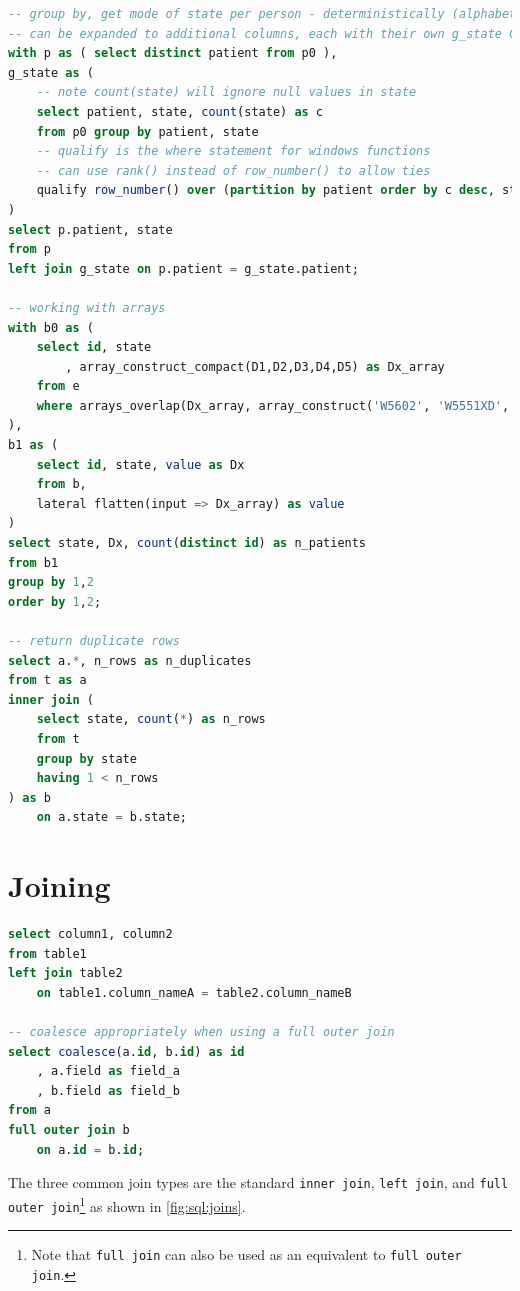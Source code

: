 \begin{lstlisting}[language=SQL]
-- group by, get mode of state per person - deterministically (alphabetical order)
-- can be expanded to additional columns, each with their own g_state CTEs
with p as ( select distinct patient from p0 ),
g_state as (
	-- note count(state) will ignore null values in state
	select patient, state, count(state) as c
	from p0 group by patient, state
	-- qualify is the where statement for windows functions
	-- can use rank() instead of row_number() to allow ties
	qualify row_number() over (partition by patient order by c desc, state asc) = 1
)
select p.patient, state
from p
left join g_state on p.patient = g_state.patient;

-- working with arrays
with b0 as (
	select id, state
		, array_construct_compact(D1,D2,D3,D4,D5) as Dx_array
	from e
	where arrays_overlap(Dx_array, array_construct('W5602', 'W5551XD', 'W5803XA'))
),
b1 as (
	select id, state, value as Dx
	from b,
	lateral flatten(input => Dx_array) as value
)
select state, Dx, count(distinct id) as n_patients
from b1
group by 1,2
order by 1,2;

-- return duplicate rows
select a.*, n_rows as n_duplicates
from t as a
inner join (
	select state, count(*) as n_rows
	from t
	group by state
	having 1 < n_rows
) as b
	on a.state = b.state;
\end{lstlisting}

\section{Joining}
\label{sql:join}

\begin{lstlisting}[language=SQL]
select column1, column2
from table1
left join table2
	on table1.column_nameA = table2.column_nameB

-- coalesce appropriately when using a full outer join
select coalesce(a.id, b.id) as id
	, a.field as field_a
	, b.field as field_b
from a
full outer join b
	on a.id = b.id;
\end{lstlisting}

The three common join types are the standard
\texttt{inner join}, \texttt{left join},
and \texttt{full outer join}\footnote{Note that \texttt{full join} can also be used as an equivalent to \texttt{full outer join}.} as
shown in \cref{fig:sql:joins}.

